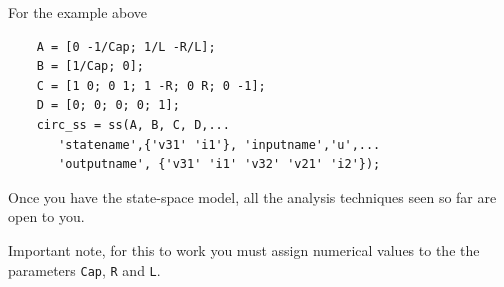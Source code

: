 \begin{slide}
	For the example above
	\begin{verbatim}
	A = [0 -1/Cap; 1/L -R/L];
	B = [1/Cap; 0];
	C = [1 0; 0 1; 1 -R; 0 R; 0 -1];
	D = [0; 0; 0; 0; 1];
	circ_ss = ss(A, B, C, D,...
	   'statename',{'v31' 'i1'}, 'inputname','u',...
	   'outputname', {'v31' 'i1' 'v32' 'v21' 'i2'});	
	\end{verbatim}
	Once you have the state-space model, all the analysis techniques seen so far are open to you.
\end{slide}

Important note, for this to work you must assign numerical values to the the parameters \texttt{Cap}, \texttt{R} and \texttt{L}.


 


\endinput

